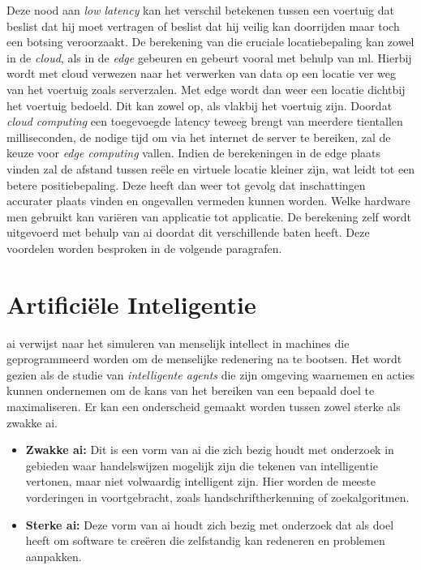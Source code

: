 Deze nood aan \textit{low latency} kan het verschil betekenen tussen een voertuig dat beslist dat hij moet vertragen of beslist dat hij veilig kan doorrijden maar toch een botsing veroorzaakt. De berekening van die cruciale locatiebepaling kan zowel in de \textit{cloud}, als in de \textit{edge}\cite{edgecomputingLi} gebeuren en gebeurt vooral met behulp van \gls{ml}. Hierbij wordt met cloud verwezen naar het verwerken van data op een locatie ver weg van het voertuig zoals serverzalen. Met edge wordt dan weer een locatie dichtbij het voertuig bedoeld. Dit kan zowel op, als vlakbij het voertuig zijn. Doordat \textit{cloud computing} een toegevoegde latency teweeg brengt van meerdere tientallen milliseconden, de nodige tijd om via het internet de server te bereiken, zal de keuze voor \textit{edge computing} vallen. Indien de berekeningen in de edge plaats vinden zal de afstand tussen re\"ele en virtuele locatie kleiner zijn, wat leidt tot een betere positiebepaling. Deze heeft dan weer tot gevolg dat inschattingen accurater plaats vinden en ongevallen vermeden kunnen worden. Welke hardware men gebruikt kan vari\"eren van applicatie tot applicatie. De berekening zelf wordt uitgevoerd met behulp van \gls{ai} doordat dit verschillende baten heeft. Deze voordelen worden besproken in de volgende paragrafen.



\newpage

\section{Artifici\"ele Inteligentie}
\gls{ai} verwijst naar het simuleren van menselijk intellect in machines die geprogrammeerd worden om de menselijke redenering na te bootsen. Het wordt gezien als de studie van \textit{intelligente agents} die zijn omgeving waarnemen en acties kunnen ondernemen om de kans van het bereiken van een bepaald doel te maximaliseren\cite{poole1998computational}. Er kan een onderscheid gemaakt worden tussen zowel sterke als zwakke \gls{ai}.
\begin{itemize}
	\item \textbf{Zwakke \gls{ai}:} Dit is een vorm van \gls{ai} die zich bezig houdt met onderzoek in gebieden waar handelswijzen mogelijk zijn die tekenen van intelligentie vertonen, maar niet volwaardig intelligent zijn. Hier worden de meeste vorderingen in voortgebracht, zoals handschriftherkenning of zoekalgoritmen.
	\item \textbf{Sterke \gls{ai}:} Deze vorm van \gls{ai} houdt zich bezig met onderzoek dat als doel heeft om software te cre\"eren die zelfstandig kan redeneren en problemen aanpakken.
\end{itemize}

